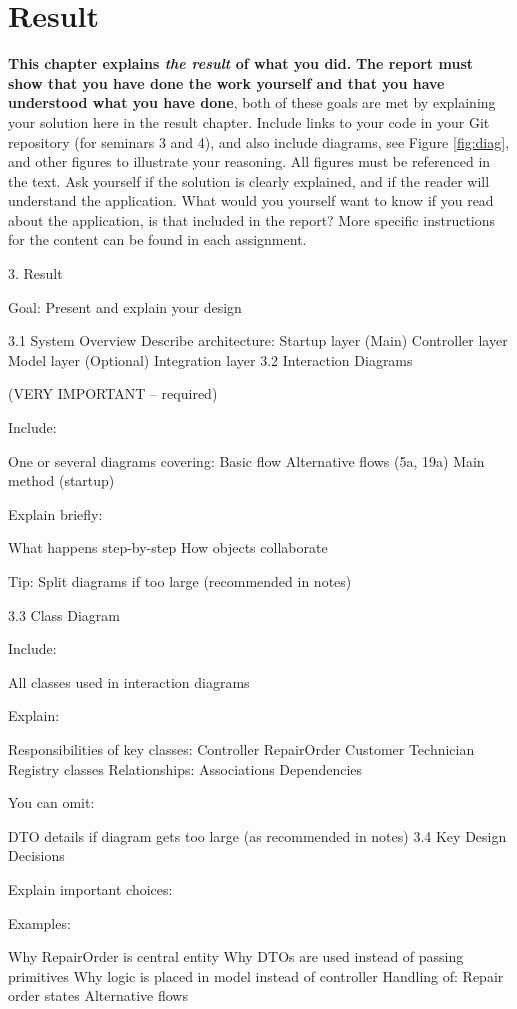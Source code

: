 \documentclass[a4paper]{scrartcl}
\begin{document}
\section{Result}
\label{sec:result}

\textbf{This chapter explains \textit{the result} of what you did.} \textbf{The report must show that you have done the work yourself and that you have understood what you have done}, both of these goals are met by explaining your solution here in the result chapter. Include links to your code in your Git repository (for seminars 3 and 4), and also include diagrams, see Figure \ref{fig:diag}, and other figures to illustrate your reasoning. All figures must be referenced in the text. Ask yourself if the solution is clearly explained, and if the reader will understand the application. What would you yourself want to know if you read about the application, is that included in the report? More specific instructions for the content can be found in each assignment. 

3. Result

Goal: Present and explain your design

3.1 System Overview
Describe architecture:
Startup layer (Main)
Controller layer
Model layer
(Optional) Integration layer
3.2 Interaction Diagrams

(VERY IMPORTANT – required)

Include:

One or several diagrams covering:
Basic flow
Alternative flows (5a, 19a)
Main method (startup)

Explain briefly:

What happens step-by-step
How objects collaborate

Tip: Split diagrams if too large (recommended in notes)

3.3 Class Diagram

Include:

All classes used in interaction diagrams

Explain:

Responsibilities of key classes:
Controller
RepairOrder
Customer
Technician
Registry classes
Relationships:
Associations
Dependencies

You can omit:

DTO details if diagram gets too large (as recommended in notes)
3.4 Key Design Decisions

Explain important choices:

Examples:

Why RepairOrder is central entity
Why DTOs are used instead of passing primitives
Why logic is placed in model instead of controller
Handling of:
Repair order states
Alternative flows
\end{document}
